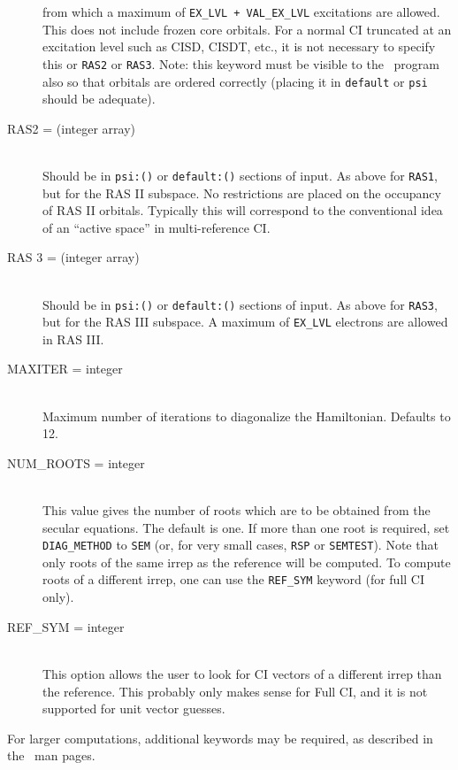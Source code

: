 \begin{description}
from which a maximum of {\tt EX\_LVL + VAL\_EX\_LVL} excitations
are allowed.
This does not include frozen core orbitals.  For a normal
CI truncated at an excitation level such as CISD, CISDT, etc., it is
not necessary to specify this or {\tt RAS2} or {\tt RAS3}.
Note: this keyword must be visible to the \PSItransqt\ program
also so that orbitals are ordered correctly (placing it in 
{\tt default} or {\tt psi} should be adequate).
\item[RAS2 = (integer array)]\mbox{}\\
Should be in {\tt psi:()} or {\tt default:()} sections of input.
As above for {\tt RAS1}, but for the RAS II subspace.  
No restrictions are placed on the occupancy of RAS II orbitals.
Typically this will correspond to the conventional idea of
an ``active space'' in multi-reference CI.
\item[RAS 3 = (integer array)]\mbox{}\\
Should be in {\tt psi:()} or {\tt default:()} sections of input.
As above for {\tt RAS3}, but for the RAS III subspace.
A maximum of {\tt EX\_LVL} electrons are allowed in RAS III.
\item[MAXITER = integer]\mbox{}\\
Maximum number of iterations to diagonalize the Hamiltonian.
Defaults to 12.
\item[NUM\_ROOTS = integer]\mbox{}\\
This value gives the number of roots which are to be obtained from
the secular equations.  The default is one.  If more than one root
is required, set {\tt DIAG\_METHOD} to {\tt SEM} (or, for very small cases,
{\tt RSP} or {\tt SEMTEST}).  Note that only roots of the same
irrep as the reference will be computed.  To compute roots of a different
irrep, one can use the {\tt REF\_SYM} keyword (for full CI only).
\item[REF\_SYM = integer]\mbox{}\\
This option allows the user to look for CI vectors of a different irrep
than the reference.  This probably only makes sense for Full CI,
and it is not supported for unit vector guesses.
\end{description}

For larger computations, additional keywords may be required, as
described in the \PSIdetci\ man pages.

